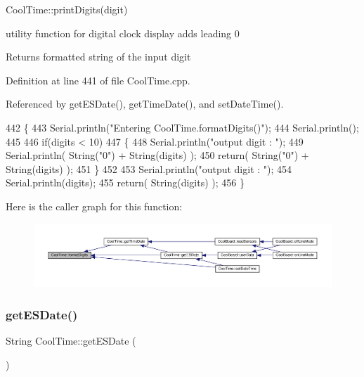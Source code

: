 Cool\+Time\+::print\+Digits(digit)

utility function for digital clock display adds leading 0

\begin{DoxyReturn}{Returns}
formatted string of the input digit 
\end{DoxyReturn}


Definition at line 441 of file Cool\+Time.\+cpp.



Referenced by get\+E\+S\+Date(), get\+Time\+Date(), and set\+Date\+Time().


\begin{DoxyCode}
442 \{
443     Serial.println(\textcolor{stringliteral}{"Entering CoolTime.formatDigits()"});
444     Serial.println();
445 
446     \textcolor{keywordflow}{if}(digits < 10)
447     \{
448         Serial.println(\textcolor{stringliteral}{"output digit : "});
449         Serial.println( String(\textcolor{stringliteral}{"0"}) + String(digits) );
450         \textcolor{keywordflow}{return}( String(\textcolor{stringliteral}{"0"}) + String(digits) );
451     \}
452     
453     Serial.println(\textcolor{stringliteral}{"output digit : "});
454     Serial.println(digits);
455     \textcolor{keywordflow}{return}( String(digits) );
456 \}
\end{DoxyCode}
Here is the caller graph for this function\+:
\nopagebreak
\begin{figure}[H]
\begin{center}
\leavevmode
\includegraphics[width=350pt]{classCoolTime_acd537cd4210d7bde4e1f5c47d2ac0456_icgraph}
\end{center}
\end{figure}
\mbox{\label{classCoolTime_ac4f32ee513c1328d984306645e8785a4}} 
\subsubsection{\texorpdfstring{get\+E\+S\+Date()}{getESDate()}}
{\footnotesize\ttfamily String Cool\+Time\+::get\+E\+S\+Date (\begin{DoxyParamCaption}{ }\end{DoxyParamCaption})}

